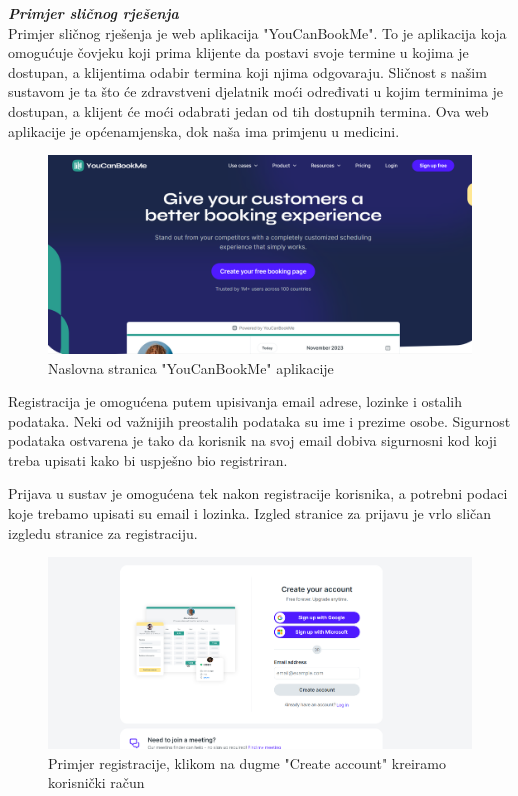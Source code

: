 \textbf{\textit{Primjer sličnog rješenja}}\\

Primjer sličnog rješenja je web aplikacija "YouCanBookMe". To je aplikacija koja omogućuje čovjeku koji prima klijente da postavi svoje termine u kojima je dostupan, a klijentima odabir termina koji njima odgovaraju. Sličnost s našim sustavom je ta što će zdravstveni djelatnik moći određivati u kojim terminima je dostupan, a klijent će moći odabrati jedan od tih dostupnih termina. Ova web aplikacije je općenamjenska, dok naša ima primjenu u medicini. 

\begin{figure}[H]
	\includegraphics[scale=0.36]{slike/YouCanBookMe-Naslovna.PNG} %
	\centering
	\caption{Naslovna stranica "YouCanBookMe" aplikacije}
	\label{fig:promjene}
\end{figure}

Registracija je omogućena putem upisivanja email adrese, lozinke i ostalih podataka. Neki od važnijih preostalih podataka su ime i prezime osobe. Sigurnost podataka ostvarena je tako da korisnik na svoj email dobiva sigurnosni kod koji treba upisati kako bi uspješno bio registriran. 

Prijava u sustav je omogućena tek nakon registracije korisnika, a potrebni podaci koje trebamo upisati su email i lozinka. Izgled stranice za prijavu je vrlo sličan izgledu stranice za registraciju.

\begin{figure}[H]
	\includegraphics[scale=0.4]{slike/YouCanBookMe-Registracija1.PNG} %
	\centering
	\caption{Primjer registracije, klikom na dugme "Create account" kreiramo korisnički račun}
	\label{fig:promjene}
\end{figure}

